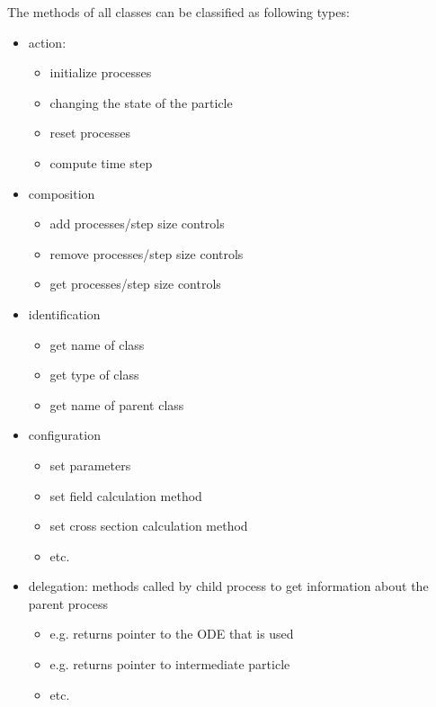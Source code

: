The methods of all classes can be classified as following types:
\begin{itemize}
    \item action: 
        \begin{itemize}
            \item initialize processes
            \item changing the state of the particle
            \item reset processes
            \item compute time step
        \end{itemize}
    \item composition       
        \begin{itemize}
            \item add processes/step size controls
            \item remove processes/step size controls
            \item get processes/step size controls
        \end{itemize}
    \item identification
        \begin{itemize}
            \item get name of class
            \item get type of class
            \item get name of parent class
        \end{itemize}
    \item configuration
        \begin{itemize}
            \item set parameters
            \item set field calculation method
            \item set cross section calculation method
            \item etc.
        \end{itemize}
    \item delegation:  methods called by child process to get information about the parent process 
        \begin{itemize}
            \item e.g. returns pointer to the ODE that is used
            \item e.g. returns pointer to intermediate particle
            \item etc.
        \end{itemize}
\end{itemize}

